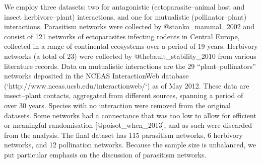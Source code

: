 We employ three datasets: two for antagonistic (ectoparasite--animal
host and insect herbivore--plant) interactions, and one for mutualistic
(pollinator--plant) interactions. Parasitism networks were collected by
@stanko_mammal_2002 and consist of 121 networks of ectoparasites infecting
rodents in Central Europe, collected in a range of continental ecosystems over
a period of 19 years. Herbivory networks (a total of 23) were collected by
@thebault_stability_2010 from various literature records. Data on mutualistic
interactions are the 29 “plant–pollinators” networks deposited in the
NCEAS InteractionWeb database (`http://www.nceas.ucsb.edu/interactionweb/`) as
of May 2012. These data are insect–plant contacts, aggregated from different
sources, spanning a period of over 30 years. Species with no interaction
were removed from the original datasets. Some networks had a connectance
that was too low to allow for efficient or meaningful randomisation
[@poisot_when_2013], and as such were discarded from the analysis. The
final dataset has 115 parasitism networks, 6 herbivory networks, and 12
pollination networks. Because the sample size is unbalanced, we put
particular emphasis on the discussion of parasitism networks.
